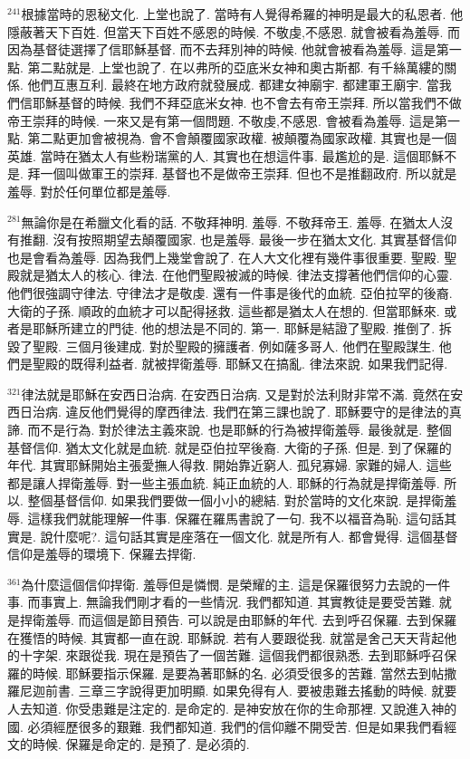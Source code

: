 \documentclass{book}
\begin{document}
$^{241}$根據當時的恩秘文化.
上堂也說了.
當時有人覺得希羅的神明是最大的私恩者.
他隱蔽著天下百姓.
但當天下百姓不感恩的時候.
不敬虔,不感恩.
就會被看為羞辱.
而因為基督徒選擇了信耶穌基督.
而不去拜別神的時候.
他就會被看為羞辱.
這是第一點.
第二點就是.
上堂也說了.
在以弗所的亞底米女神和奧古斯都.
有千絲萬縷的關係.
他們互惠互利.
最終在地方政府就發展成.
都建女神廟宇.
都建軍王廟宇.
當我們信耶穌基督的時候.
我們不拜亞底米女神.
也不會去有帝王崇拜.
所以當我們不做帝王崇拜的時候.
一來又是有第一個問題.
不敬虔,不感恩.
會被看為羞辱.
這是第一點.
第二點更加會被視為.
會不會顛覆國家政權.
被顛覆為國家政權.
其實也是一個英雄.
當時在猶太人有些粉瑞黨的人.
其實也在想這件事.
最尷尬的是.
這個耶穌不是.
拜一個叫做軍王的崇拜.
基督也不是做帝王崇拜.
但也不是推翻政府.
所以就是羞辱.
對於任何單位都是羞辱.

$^{281}$無論你是在希臘文化看的話.
不敬拜神明.
羞辱.
不敬拜帝王.
羞辱.
在猶太人沒有推翻.
沒有按照期望去顛覆國家.
也是羞辱.
最後一步在猶太文化.
其實基督信仰也是會看為羞辱.
因為我們上幾堂會說了.
在人大文化裡有幾件事很重要.
聖殿.
聖殿就是猶太人的核心.
律法.
在他們聖殿被滅的時候.
律法支撐著他們信仰的心靈.
他們很強調守律法.
守律法才是敬虔.
還有一件事是後代的血統.
亞伯拉罕的後裔.
大衛的子孫.
順政的血統才可以配得拯救.
這些都是猶太人在想的.
但當耶穌來.
或者是耶穌所建立的門徒.
他的想法是不同的.
第一.
耶穌是結證了聖殿.
推倒了.
拆毀了聖殿.
三個月後建成.
對於聖殿的擁護者.
例如薩多哥人.
他們在聖殿謀生.
他們是聖殿的既得利益者.
就被捍衛羞辱.
耶穌又在搞亂.
律法來說.
如果我們記得.

$^{321}$律法就是耶穌在安西日治病.
在安西日治病.
又是對於法利財非常不滿.
竟然在安西日治病.
違反他們覺得的摩西律法.
我們在第三課也說了.
耶穌要守的是律法的真諦.
而不是行為.
對於律法主義來說.
也是耶穌的行為被捍衛羞辱.
最後就是.
整個基督信仰.
猶太文化就是血統.
就是亞伯拉罕後裔.
大衛的子孫.
但是.
到了保羅的年代.
其實耶穌開始主張愛撫人得救.
開始靠近窮人.
孤兒寡婦.
家難的婦人.
這些都是讓人捍衛羞辱.
對一些主張血統.
純正血統的人.
耶穌的行為就是捍衛羞辱.
所以.
整個基督信仰.
如果我們要做一個小小的總結.
對於當時的文化來說.
是捍衛羞辱.
這樣我們就能理解一件事.
保羅在羅馬書說了一句.
我不以福音為恥.
這句話其實是.
說什麼呢?.
這句話其實是座落在一個文化.
就是所有人.
都會覺得.
這個基督信仰是羞辱的環境下.
保羅去捍衛.

$^{361}$為什麼這個信仰捍衛.
羞辱但是憐憫.
是榮耀的主.
這是保羅很努力去說的一件事.
而事實上.
無論我們剛才看的一些情況.
我們都知道.
其實教徒是要受苦難.
就是捍衛羞辱.
而這個是節目預告.
可以說是由耶穌的年代.
去到呼召保羅.
去到保羅在獲悟的時候.
其實都一直在說.
耶穌說.
若有人要跟從我.
就當是舍己天天背起他的十字架.
來跟從我.
現在是預告了一個苦難.
這個我們都很熟悉.
去到耶穌呼召保羅的時候.
耶穌要指示保羅.
是要為著耶穌的名.
必須受很多的苦難.
當然去到帖撒羅尼迦前書.
三章三字說得更加明顯.
如果免得有人.
要被患難去搖動的時候.
就要人去知道.
你受患難是注定的.
是命定的.
是神安放在你的生命那裡.
又說進入神的國.
必須經歷很多的艱難.
我們都知道.
我們的信仰離不開受苦.
但是如果我們看經文的時候.
保羅是命定的.
是預了.
是必須的.
\end{document}
